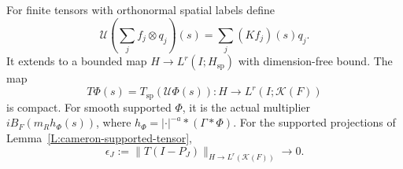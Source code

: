 \begin{proposition}\label{P:cameron-full-mean}
  For finite tensors with orthonormal spatial labels define
  \[
    \mathcal U\left(\sum_j f_j\otimes q_j\right)(s)
    =\sum_j(Kf_j)(s)q_j.
  \]
  It extends to a bounded map $H\to L^r(I;H_{\mathrm{sp}})$
  with dimension-free bound.
  The map
  \begin{equation}\label{E:cameron-full-mean}
    T\Phi(s)=T_{\mathrm{sp}}(\mathcal U\Phi(s))
    :H\longrightarrow L^r(I;\mathcal K(F))
  \end{equation}
  is compact. For smooth supported $\Phi$, it is the actual
  multiplier $iB_F(m_Rh_\Phi(s))$, where
  $h_\Phi=|\cdot|^{-a}*(\Gamma*\Phi)$.
  For the supported projections of Lemma~\ref{L:cameron-supported-tensor},
  \begin{equation}\label{E:cameron-compact-tail}
    \epsilon_J:=\|T(I-P_J)\|_{H\to L^r(\mathcal K(F))}
    \longrightarrow0.
  \end{equation}
\end{proposition}

